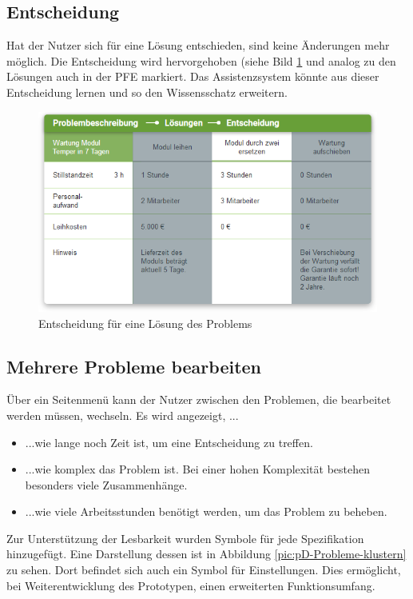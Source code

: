 \subsection{Entscheidung}
Hat der Nutzer sich für eine Lösung entschieden, sind keine Änderungen mehr möglich. Die Entscheidung wird hervorgehoben (siehe Bild \ref{pic:pD-Entscheidung} und analog zu den Lösungen auch in der PFE markiert. Das Assistenzsystem könnte aus dieser Entscheidung lernen und so den Wissensschatz erweitern. 
\begin{figure}[htbp]
\centering
\includegraphics[scale=0.7]{DA_files/Bilder/Konzept/Skizze-Entscheidung.png}
\caption{Entscheidung für eine Lösung des Problems}
\label{pic:pD-Entscheidung}
\end{figure}

\subsection{Mehrere Probleme bearbeiten}
Über ein Seitenmenü kann der Nutzer zwischen den Problemen, die bearbeitet werden müssen, wechseln. Es wird angezeigt, ...
\begin{itemize}
\item ...wie lange noch Zeit ist, um eine Entscheidung zu treffen.
\item ...wie komplex das Problem ist. Bei einer hohen Komplexität bestehen besonders viele Zusammenhänge.
\item ...wie viele Arbeitsstunden benötigt werden, um das Problem zu beheben.
\end{itemize}
Zur Unterstützung der Lesbarkeit wurden Symbole für jede Spezifikation hinzugefügt. Eine Darstellung dessen ist in Abbildung \ref{pic:pD-Probleme-klustern} zu sehen. Dort befindet sich auch ein Symbol für Einstellungen. Dies ermöglicht, bei Weiterentwicklung des Prototypen, einen erweiterten Funktionsumfang.

